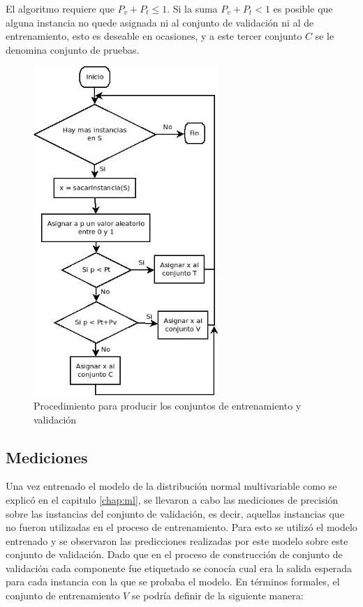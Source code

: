 \documentclass[a4paper, 11pt, oneside]{report}
\begin{document}
El algoritmo requiere que $P_v + P_t \le 1$. Si la suma $P_v + P_t < 1$ es posible que alguna instancia no quede asignada ni al conjunto de validación ni al de entrenamiento, esto es deseable en ocasiones, y a este tercer conjunto $C$ se le denomina conjunto de pruebas. %

\begin{figure}[htb]
\begin{center}
\leavevmode
\includegraphics[width=7cm]{diagrams/setPartition.jpg}
\end{center}
\caption{Procedimiento para producir los conjuntos de entrenamiento y validación}
\label{fig:setPartition}
\end{figure}

\subsection{Mediciones}

Una vez entrenado el modelo de la distribución normal multivariable como se explicó en el capitulo \ref{chap:ml}, se llevaron a cabo las mediciones de precisión sobre las instancias del conjunto de validación, es decir, aquellas instancias que no fueron utilizadas en el proceso de entrenamiento. Para esto se utilizó el modelo entrenado y se observaron las predicciones realizadas por este modelo sobre este conjunto de validación. Dado que en el proceso de construcción de conjunto de validación cada componente fue etiquetado se conocía cual era la salida esperada para cada instancia con la que se probaba el modelo. En términos formales, el conjunto de entrenamiento $V$ se podría definir de la siguiente manera:
\end{document}
